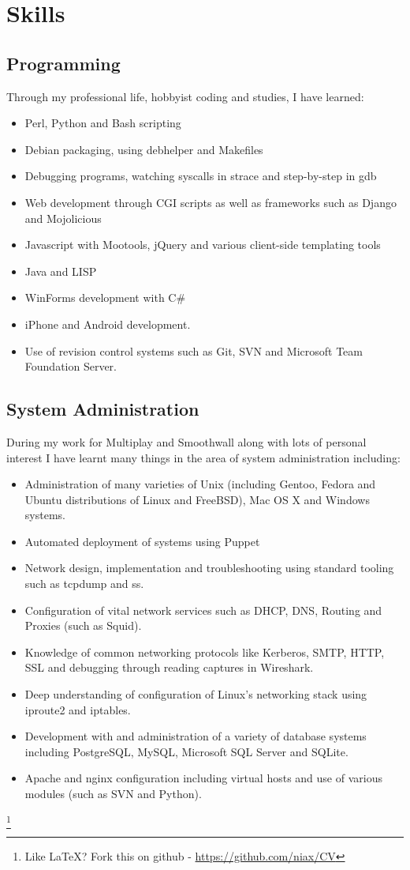\documentclass[11pt]{report}
\newcommand\blfootnote[1]{%
	\begingroup
	\renewcommand\thefootnote{}\footnote{#1}%
	\addtocounter{footnote}{-1}%
	\endgroup
}
\begin{document}
\section*{Skills}
\subsection*{Programming}
Through my professional life, hobbyist coding and studies, I have learned: 
\begin{itemize}[itemsep=2pt ,parsep=2pt]
\item Perl, Python and Bash scripting
\item Debian packaging, using {\ttfamily debhelper} and Makefiles
\item Debugging programs, watching syscalls in {\ttfamily strace} and step-by-step in {\ttfamily gdb}
\item Web development through CGI scripts as well as frameworks such as Django and Mojolicious
\item Javascript with Mootools, jQuery and various client-side templating tools
\item Java and LISP
\item WinForms development with C\#
\item iPhone and Android development.
\item Use of revision control systems such as Git, SVN and Microsoft Team Foundation Server.
\end{itemize}
\subsection*{System Administration}
During my work for Multiplay and Smoothwall along with lots of personal interest I have learnt many things in the area of system administration including:
\begin{itemize}[itemsep=2pt ,parsep=2pt]
\item Administration of many varieties of Unix (including Gentoo, Fedora and Ubuntu distributions of Linux and FreeBSD), Mac OS X and Windows systems.
\item Automated deployment of systems using Puppet
\item Network design, implementation and troubleshooting using standard tooling such as {\ttfamily tcpdump} and {\ttfamily ss}.
\item Configuration of vital network services such as DHCP, DNS, Routing and Proxies (such as Squid).
\item Knowledge of common networking protocols like Kerberos, SMTP, HTTP, SSL and debugging through reading captures in Wireshark.
\item Deep understanding of configuration of Linux's networking stack using {\ttfamily iproute2} and {\ttfamily iptables}.
\item Development with and administration of a variety of database systems including PostgreSQL, MySQL, Microsoft SQL Server and SQLite.
\item Apache and nginx configuration including virtual hosts and use of various modules (such as SVN and Python).
\end{itemize}
\blfootnote{Like \LaTeX? Fork this on github - \url{https://github.com/niax/CV}}
\end{document}
